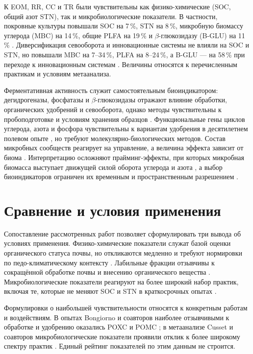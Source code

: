 \documentclass{ai4science_ysda}
\begin{document}
К EOM, RR, CC и TR были чувствительны как физико-химические (SOC, общий
азот STN), так и микробиологические показатели. В частности, покровные
культуры повышали SOC на 7\,\%, STN на 8\,\%, микробную биомассу углерода
(MBC) на 14\,\%, общие PLFA на 19\,\% и $\beta$-глюкозидазу (B-GLU) на
11\,\% \cite{cusset2024}. Диверсификация севооборота и инновационные
системы не влияли на SOC и STN, но повышали MBC на 7--34\,\%, PLFA на
8--24\,\%, а B-GLU — на 58\,\% при переходе к инновационным системам
\cite{cusset2024}. Величины относятся к перечисленным практикам и условиям
метаанализа.

Ферментативная активность служит самостоятельным биоиндикатором:
дегидрогеназы, фосфатазы и $\beta$-глюкозидазы отражают влияние обработки,
органических удобрений и севооборота, однако методы чувствительны к
пробоподготовке и условиям хранения образцов \cite{bhupenchandra2026}.
Функциональные гены циклов углерода, азота и фосфора чувствительны к
вариантам удобрения в десятилетнем полевом опыте \cite{jia2025}, но требуют
молекулярно-биологических методов. Состав микробных сообществ реагирует на
управление, а величина эффекта зависит от биома \cite{trivedi2016}.
Интерпретацию осложняют прайминг-эффекты, при которых микробная биомасса
выступает движущей силой оборота углерода и азота \cite{kuzyakov2010}, а
выбор биоиндикаторов ограничен их временным и пространственным разрешением
\cite{bhaduri2022}.

\section{Сравнение и условия применения}

\porozhdeno{} Сопоставление рассмотренных работ позволяет сформулировать
три вывода об условиях применения. Физико-химические показатели служат
базой оценки органического статуса почвы, но откликаются медленно и требуют
нормировки по педо-климатическому контексту \cite{feeney2024,cardoso2013}.
Лабильные фракции отзывчивы к сокращённой обработке почвы и внесению
органического вещества \cite{bongiorno2019}. Микробиологические показатели
реагируют на более широкий набор практик, включая те, которые не меняют SOC
и STN в краткосрочных опытах \cite{cusset2024}.

Формулировки о наибольшей чувствительности относятся к конкретным работам и
воздействиям. В опытах Bongiorno и соавторов наиболее отзывчивыми к
обработке и удобрению оказались POXC и POMC \cite{bongiorno2019}; в
метаанализе Cusset и соавторов микробиологические показатели проявили
отклик к более широкому спектру практик \cite{cusset2024}. Единый рейтинг
показателей по этим данным не строится.
\end{document}
